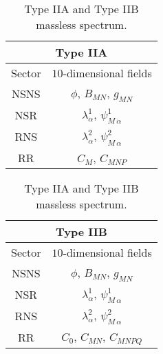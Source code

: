 \documentclass[12pt,a4paper]{book}
\begin{document}
\renewcommand{\arraystretch}{1.4}
\begin{table}[tb]
\begin{center}
\begin{tabular}{cc}
\multicolumn{2}{c}{Type IIA} \\
\hline
Sector & $10$-dimensional fields \\
\hline
NSNS & $\phi$, $B_{MN}$, $g_{MN}$ \\
NSR & $\lambda^1_{\dot{\alpha}}$, $\psi^1_{M \, \dot{\alpha}}$ \\
RNS & $\lambda^2_{\alpha}$, $\psi^2_{M \, \alpha}$ \\
RR & $C_M$, $C_{MNP}$ \\
\hline
\end{tabular} \qquad 
\begin{tabular}{cc}
\multicolumn{2}{c}{Type IIB} \\
\hline
Sector & $10$-dimensional fields \\
\hline
NSNS & $\phi$, $B_{MN}$, $g_{MN}$ \\
NSR & $\lambda^1_{\alpha}$, $\psi^1_{M \, \alpha}$ \\
RNS & $\lambda^2_{\alpha}$, $\psi^2_{M \, \alpha}$ \\
RR & $C_0$, $C_{MN}$, $C_{MNPQ}$ \\
\hline
\end{tabular}
\caption{Type IIA and Type IIB massless spectrum.\label{tab:TypeIIspectrum}}
\vspace{-0.6cm}
\end{center}
\end{table}
\end{document}
